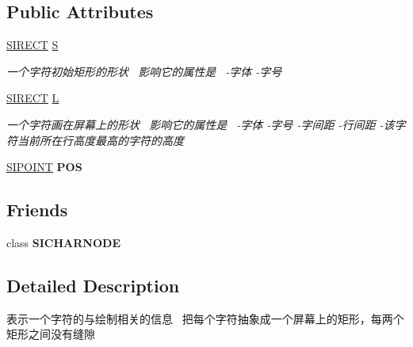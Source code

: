 \subsection*{Public Attributes}
\begin{DoxyCompactItemize}
\item 
\hyperlink{struct_s_i_r_e_c_t}{S\+I\+R\+E\+CT} \hyperlink{class_s_i_d_r_a_w___i_n_f_o_a495fac5bcc54e4b58d500a7117fde9d9}{S}
\begin{DoxyCompactList}\small\item\em 一个字符初始矩形的形状~\newline
影响它的属性是~\newline
 -\/字体 -\/字号 \end{DoxyCompactList}\item 
\hyperlink{struct_s_i_r_e_c_t}{S\+I\+R\+E\+CT} \hyperlink{class_s_i_d_r_a_w___i_n_f_o_a41065961d296d245790773771670aae2}{L}
\begin{DoxyCompactList}\small\item\em 一个字符画在屏幕上的形状~\newline
影响它的属性是~\newline
 -\/字体 -\/字号 -\/字间距 -\/行间距 -\/该字符当前所在行高度最高的字符的高度 \end{DoxyCompactList}\item 
\mbox{\label{class_s_i_d_r_a_w___i_n_f_o_ac2c7884804dc5749fb45d859ad63b10c}} 
\hyperlink{struct_s_i_p_o_i_n_t}{S\+I\+P\+O\+I\+NT} {\bfseries P\+OS}
\end{DoxyCompactItemize}
\subsection*{Friends}
\begin{DoxyCompactItemize}
\item 
\mbox{\label{class_s_i_d_r_a_w___i_n_f_o_a33fe671aa658d4d9c3e3723f54dd2f31}} 
class {\bfseries S\+I\+C\+H\+A\+R\+N\+O\+DE}
\end{DoxyCompactItemize}


\subsection{Detailed Description}
表示一个字符的与绘制相关的信息~\newline
把每个字符抽象成一个屏幕上的矩形，每两个矩形之间没有缝隙 

